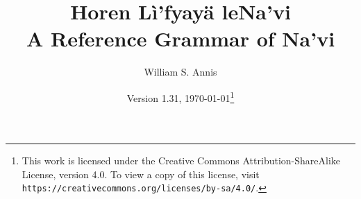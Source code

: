 \documentclass[12pt,oneside]{book}
\begin{document}
\frenchspacing

\title{Horen Lì'fyayä leNa'vi\\A Reference Grammar of Na'vi}
\author{William S. Annis}
\date{Version 1.31, \today\footnote{This work is licensed
    under the Creative Commons Attribution-ShareAlike License, version
    4.0.  To view a copy of this license, visit 
    \texttt{https://creativecommons.org/licenses/by-sa/4.0/}.}}
\maketitle

\setcounter{tocdepth}{2}
\begin{multicols}{2}
\tableofcontents
\end{multicols}










\appendix
{\small \printindex}


\end{document}
